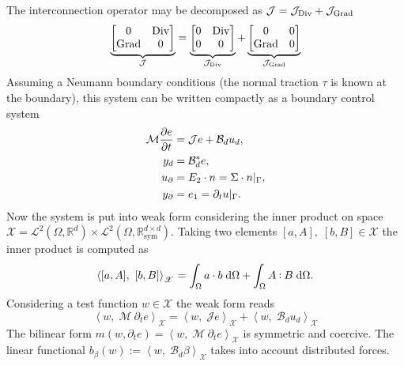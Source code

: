 The interconnection operator may be decomposed as $\mathcal{J} = \mathcal{J}_{\operatorname*{Div}} + \mathcal{J}_{\operatorname*{Grad}}$
\begin{equation}
\underbrace{\begin{bmatrix}
	0 & \operatorname*{Div} \\ \operatorname*{Grad} & 0 \\
	\end{bmatrix}}_{\mathcal{J}} = 
\underbrace{\begin{bmatrix}
	0 & \operatorname*{Div} \\ 0  & 0 \\
	\end{bmatrix}}_{\mathcal{J}_{\operatorname*{Div}}} + 
\underbrace{\begin{bmatrix}
	0 & 0 \\ \operatorname*{Grad} & 0 \\
	\end{bmatrix}}_{\mathcal{J}_{\operatorname*{Grad}}}
\end{equation}
Assuming a Neumann boundary conditions (the normal traction $\tau$ is known at the boundary),
this system can be written compactly as a boundary control system
\begin{equation}
\label{eq:eldyn_PDE}
\begin{aligned}
\mathcal{M} \diffp{e}{t} &= \mathcal{J} e + \mathcal{B}_d u_d, \\
y_d &= \mathcal{B}_d^* e, \\
u_\partial &= E_2 \cdot n = \Sigma \cdot n|_{\Gamma}, \\
y_\partial &= e_1 = \partial_t u|_{\Gamma}.
\end{aligned}
\end{equation}
Now the system is put into weak form considering the inner product on space $\mathscr{X} = \mathscr{L}^2(\Omega, \mathbb{R}^d) \times \mathscr{L}^2(\Omega, \mathbb{R}^{d\times d}_{\text{sym}})$. Taking two elements $[a, A], \; [b, B] \in \mathscr{X}$ the inner product is computed as
\[
\left\langle [a, A], \ [b, B] \right\rangle_{\mathscr{X}} = \int_{\Omega} a \cdot b \d{\Omega} + \int_{\Omega} A \cddot B \d{\Omega}.
\]
Considering a test function $w \in \mathscr{X}$ the weak form reads
\begin{equation*}
\left\langle w, \; \mathcal{M} \ \partial_t e \right\rangle_{\mathscr{X}} = \left\langle w, \; \mathcal{J} e \right\rangle_{\mathscr{X}} + \left\langle w, \; \mathcal{B}_d u_d \right\rangle_{\mathscr{X}}
\end{equation*}
The bilinear form $m(w, \partial_t e) = \left\langle w, \; \mathcal{M} \ \partial_t e \right\rangle_{\mathscr{X}}$ is symmetric and coercive. The linear functional $b_\beta(w):=\left\langle w, \; \mathcal{B}_d \beta \right\rangle_{\mathscr{X}}$ takes into account distributed forces.\\
